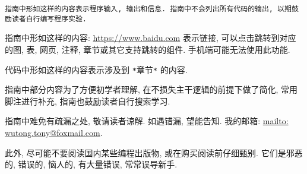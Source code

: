 
\begin{lstlisting}
指南中形如这样的内容表示程序输入, 输出和信息. 指南中不会列出所有代码的输出, 以期鼓励读者自行编写程序实验.
\end{lstlisting}

    \vspace*{5pt}
    指南中形如这样的内容: \href{https://www.baidu.com}{https://www.baidu.com} 表示链接, 可以点击跳转到对应的图, 表, 网页, 注释, 章节或其它支持跳转的组件. 手机端可能无法使用此功能.

    \begin{mdframed}[linecolor=darkgray]
        代码中形如这样的内容表示涉及到 \texttt{*}章节\texttt{*} 的内容.
    \end{mdframed}

    指南中部分内容为了方便初学者理解, 在不损失主干逻辑的前提下做了简化, 常用脚注进行补充, 指南也鼓励读者自行搜索学习.

    指南中难免有疏漏之处, 敬请读者谅解. 如遇错漏, 望能告知. 我的邮箱: \href{mailto: wutong.tony@foxmail.com}{mailto: wutong.tony@foxmail.com}.

    此外, 尽可能不要阅读国内某些编程出版物, 或在购买阅读前仔细甄别. 它们是邪恶的, 错误的, 恼人的, 有大量错误, 常常误导新手.